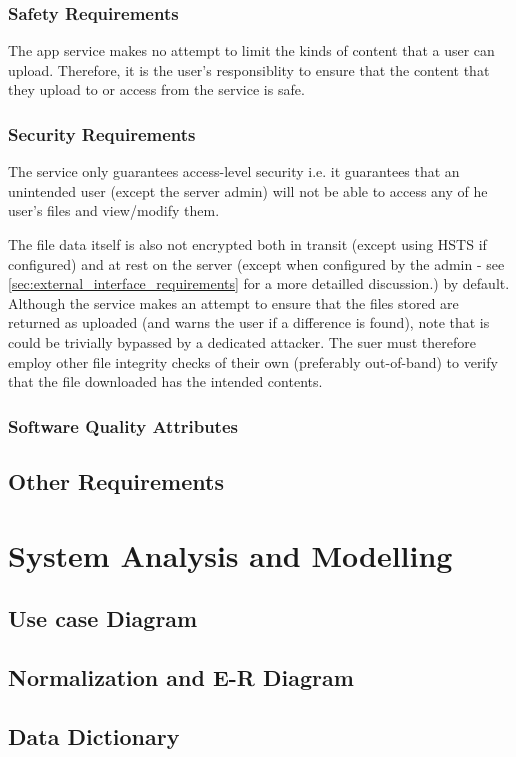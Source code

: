 \documentclass[12pt,a4paper]{report}
\begin{document}
\subsection{Safety Requirements}
The app service makes no attempt to limit the kinds of content that a user can upload.
Therefore, it is the user's responsiblity to ensure that the content that they upload to or access from the service is safe.
\subsection{Security Requirements}
The service only guarantees access-level security i.e. it guarantees that an unintended user (except the server admin) will not be able to access any of he user's files and view/modify them.

The file data itself is also not encrypted both in transit (except using HSTS if configured) and at rest on the server (except when configured by the admin - see \ref{sec:external_interface_requirements} for a more detailled discussion.) by default.
Although the service makes an attempt to ensure that the files stored are returned as uploaded (and warns the user if a difference is found), note that is could be trivially bypassed by a dedicated attacker.
The suer must therefore employ other file integrity checks of their own (preferably out-of-band) to verify that the file downloaded has the intended contents.
\subsection{Software Quality Attributes}

\section{Other Requirements}
\newpage
\chapter{System Analysis and Modelling}\label{cha:system_analysis_and_modelling}
\section{Use case Diagram}\label{sec:use_case_diagram}
\section{Normalization and E-R Diagram}\label{sec:normalisation_and_er_diagram}
\section{Data Dictionary}\label{sec:data_dictionary}
\end{document}
